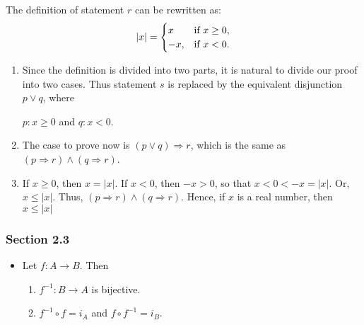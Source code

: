\documentclass[12pt]{article}
\newcommand\abs[1]{\left|#1\right|}
\begin{document}
\begin{itemize}
The definition of statement \(r\) can be rewritten as:
\[\lvert{}x\rvert{}= 
  \begin{cases} 
    x & $if $x\ge{}0,  \\
    -x, & $if $x<0.
  \end{cases} \]

\begin{enumerate}
\item Since the definition is divided into two parts, it is natural to divide our
proof into two cases. Thus statement \(s\) is replaced by the equivalent
disjunction \(p\lor{}q\), where
\begin{center}
\(p: x\ge0\) and \(q: x<0\).
\end{center}

\item The case to prove now is \((p\lor{}q)\Rightarrow{}r\), which is the same as \((p\Rightarrow{}r)\land(q\Rightarrow{}r)\).

\item If \(x\ge0\), then \(x=\lvert{}x\rvert{}\). If \(x<0\), then \(-x>0\), so that
\(x<0<-x=\lvert{}x\rvert{}\). Or, \(x\le\abs{x}\). Thus, \((p\Rightarrow{}r)\land(q\Rightarrow{}r)\). Hence, if
\(x\) is a real number, then \(x\le\abs{x}\)
\end{enumerate}
\end{itemize}
\subsubsection{Section 2.3}
\label{sec:orgf6fce87}
\begin{itemize}
\item Let \(f:A\longrightarrow{}B\). Then
\begin{enumerate}
\item \(f^{-1}:B\longrightarrow{}A\) is bijective.
\item \(f^{-1}\circ{}f=i_{A}\) and \(f\circ{}f^{-1}=i_{B}\).
\end{enumerate}
\end{itemize}
\end{document}
